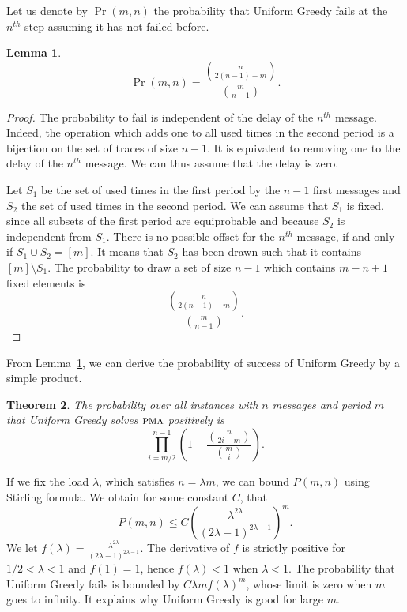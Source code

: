 \documentclass[10pt, conference, letterpaper]{IEEEtran}
\newtheorem{theorem}{Theorem}
\newtheorem{lemma}[theorem]{Lemma}
\newcommand\pma{\textsc{pma}\xspace}
\begin{document}
Let us denote by $\Pr(m,n)$ the probability that Uniform Greedy fails at the $n^{th}$
step assuming it has not failed before.

\begin{lemma}\label{lemma:proba_fail}
$$\Pr(m,n) = \frac{\binom{n}{2(n-1)-m}}{\binom{m}{n-1}}.$$
\end{lemma}
\begin{proof}
The probability to fail is independent of the delay of the $n^{th}$
message. Indeed,  the operation which adds one to all used times
in the second period  is a bijection on the set of traces of size $n-1$. It is equivalent to removing one to the delay of the $n^{th}$ message. We can thus assume that the delay is zero.

Let $S_1$ be the set of used times in the first period by the $n-1$ first messages
and $S_2$ the set of used times in the second period. We can assume that $S_1$ is fixed, since all subsets of the first period are equiprobable and because $S_2$ is independent from $S_1$. There is no possible offset for the $n^{th}$ message, if and only if $S_1 \cup S_2 = [m]$. It means that $S_2$ has been drawn such that it contains $[m] \setminus S_1$. 
The probability to draw a set of size $n-1$ which contains $m-n + 1$ fixed elements is 
 $$\frac{\binom{n}{2(n-1)-m}}{\binom{m}{n-1}}.$$
\end{proof}

From Lemma~\ref{lemma:proba_fail}, we can derive the probability 
of success of Uniform Greedy by a simple product. 

\begin{theorem}
The probability over all instances with $n$ messages and period $m$ that Uniform Greedy solves $\pma$ positively is $$\displaystyle{\prod_{i=m/2}^{n-1}(1 - \frac{\binom{n}{2i-m}}{\binom{m}{i}})}.$$
\end{theorem}

If we fix the load $\lambda$, which satisfies $n = \lambda m$, we can bound 
$P(m,n)$ using Stirling formula. We obtain for some constant $C$, 
that $$P(m,n) \leq C \left(\frac{\lambda^{2\lambda}}{(2\lambda -1)^{2\lambda -1}}\right)^m.$$
We let $f(\lambda) = \frac{\lambda^{2\lambda}}{(2\lambda -1)^{2\lambda -1}}$.
The derivative of $f$ is strictly positive for $1/2 < \lambda < 1$ and $f(1) = 1$, hence 
$f(\lambda) < 1$ when $\lambda < 1$. The probability that Uniform Greedy fails is bounded 
by $C \lambda m f(\lambda)^m$, whose limit is zero when $m$ goes to infinity. 
It explains why Uniform Greedy is good for large $m$. 
\end{document}

